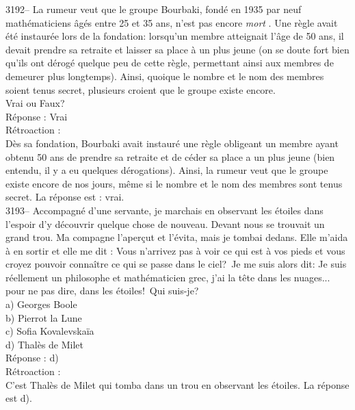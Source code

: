 \documentclass[letterpaper, 12pt]{article}
\begin{document}
3192-- La rumeur veut que le groupe Bourbaki, fond\'e en 1935 par neuf math\'ematiciens \^ag\'es entre 25 et 35 ans, n'est pas encore \og \emph{mort} \fg. Une r\`egle avait \'et\'e instaur\'ee lors de la fondation: lorsqu'un membre atteignait l'\^age de 50 ans, il devait prendre sa retraite et laisser sa place \`a un plus jeune (on se doute fort bien qu'ils ont d\'erog\'e quelque peu de cette r\`egle, permettant ainsi aux membres de demeurer plus longtemps). Ainsi, quoique le nombre et le nom des membres soient tenus secret, plusieurs croient que le groupe existe encore.\\
Vrai ou Faux?\\

R\'eponse : Vrai\\

R\'etroaction :\\
D\`es sa fondation, Bourbaki avait instaur\'e une r\`egle obligeant un membre ayant obtenu 50 ans de prendre sa retraite et de c\'eder sa place a un plus jeune (bien entendu, il y a eu quelques d\'erogations). Ainsi, la rumeur veut que le groupe existe encore de nos jours, m\^eme si le nombre et le nom des membres sont tenus secret. La r\'eponse est : vrai.\\



3193-- Accompagn\'e d'une servante, je marchais en observant les \'etoiles dans l'espoir d'y d\'ecouvrir quelque chose de nouveau. Devant nous se trouvait un grand trou. Ma compagne l'aper\c cut et l'\'evita, mais je tombai dedans. Elle m'aida \`a en sortir et elle me dit : \og Vous n'arrivez pas \`a voir ce qui est \`a vos pieds et vous croyez pouvoir conna\^itre ce qui se passe dans le ciel?\fg \ Je me suis alors dit: \og Je suis r\'eellement un philosophe et math\'ematicien grec, j'ai la t\^ete dans les nuages... pour ne pas dire, dans les \'etoiles!\fg \ Qui suis-je?\\

a) Georges Boole\\
b) Pierrot la Lune\\
c) Sofia Kovalevska\"ia\\
d) Thal\`es de Milet\\

R\'eponse : d)\\

R\'etroaction :\\
C'est Thal\`es de Milet qui tomba dans un trou en observant les \'etoiles. La r\'eponse est d).\\
\end{document}
